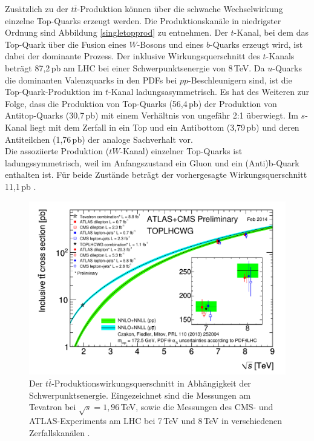 Zus\"atzlich zu der $t\overline{t}$-Produktion k\"onnen \"uber die schwache Wechselwirkung einzelne Top-Quarks erzeugt werden. Die Produktionskan\"ale in niedrigster Ordnung sind Abbildung \ref{singletopprod} zu entnehmen. Der $t$-Kanal, bei dem das Top-Quark \"uber die Fusion eines $W$-Bosons und eines $b$-Quarks erzeugt wird, ist dabei der dominante Prozess. Der inklusive Wirkungsquerschnitt des $t$-Kanals betr\"agt 87,2\,pb am LHC bei einer Schwerpunktsenergie von 8\,TeV. Da $u$-Quarks die dominanten Valenzquarks in den PDFs bei $pp$-Beschleunigern sind, ist die Top-Quark-Produktion im $t$-Kanal ladungsasymmetrisch. Es hat des Weiteren zur Folge, dass die Produktion von Top-Quarks (56,4\,pb) der Produktion von Antitop-Quarks (30,7\,pb) mit einem Verh\"altnis von ungef\"ahr 2:1 \"uberwiegt. Im $s$-Kanal liegt mit dem Zerfall in ein Top und ein Antibottom (3,79\,pb) und deren Antiteilchen (1,76\,pb) der analoge Sachverhalt vor.\\
Die assoziierte Produktion ($tW$-Kanal) einzelner Top-Quarks ist ladungssymmetrisch, weil im Anfangszustand ein Gluon und ein (Anti)b-Quark enthalten ist. F\"ur beide Zust\"ande betr\"agt der vorhergesagte Wirkungsquerschnitt 11,1\,pb \cite{Kidonakis:1449411}.

\begin{figure}[ht]
	\centering
	\includegraphics[scale=0.70]{Theorie/ttproductioncrosssection_new.pdf}
	\caption[Der $t\overline{t}$-Produktionswirkungsquerschnitt in Abh\"angigkeit der Schwer\-punkts\-energie]{Der $t\overline{t}$-Produktionswirkungsquerschnitt in Abh\"angigkeit der Schwer\-punkts\-energie. Eingezeichnet sind die Messungen am Tevatron bei $\sqrt{s}=1,96$\,TeV, sowie die Messungen des CMS- und ATLAS-Experiments am LHC bei 7\,TeV und 8\,TeV in verschiedenen Zerfallskan\"alen \cite{prodcrosssectionatlascms}.}
	\label{ttprodcross}
\end{figure}

